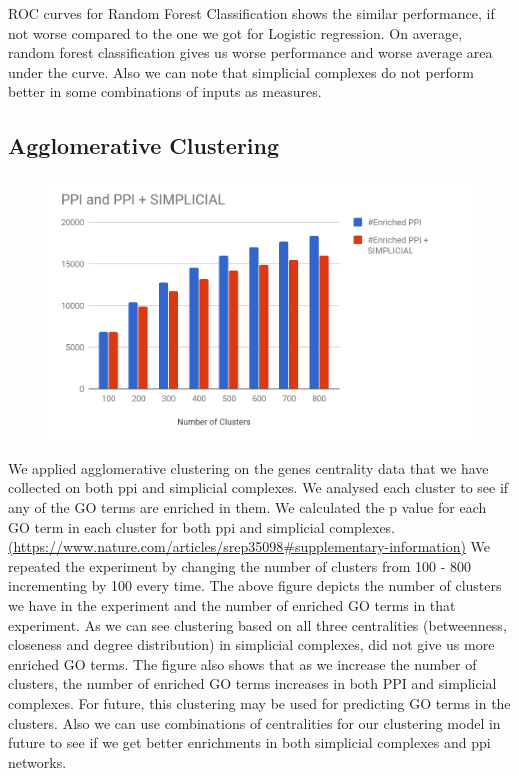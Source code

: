 \documentclass[9pt]{article}
\begin{document}
{\begin{figure}[!htb]
\endminipage
\end{figure}
ROC curves for Random Forest Classification shows the similar performance, if not worse compared to the one we got for Logistic regression. On average, random forest classification gives us worse performance and worse average area under the curve. Also we can note that simplicial complexes do not perform better in some combinations of inputs as measures.

\subsection{Agglomerative Clustering}
\begin{figure}[!htb]
  \centering
  \includegraphics[width=\linewidth]{logisticRegressionGraphs/cluster.png}
\endminipage
\end{figure}
We applied agglomerative clustering on the genes centrality data that we have collected on both ppi and simplicial complexes. We analysed each cluster to see if any of the GO terms are enriched in them. We calculated the p value for each GO term in each cluster for both ppi and simplicial complexes.\url{(https://www.nature.com/articles/srep35098\#supplementary-information)} We repeated the experiment by changing the number of clusters from 100 - 800 incrementing by 100 every time. The above figure depicts the number of clusters we have in the experiment and the number of enriched GO terms in that experiment. As we can see clustering based on all three centralities (betweenness, closeness and degree distribution) in simplicial complexes, did not give us more enriched GO terms. The figure also shows that as we increase the number of clusters, the number of enriched GO terms increases in both PPI and simplicial complexes. For future, this clustering may be used for predicting GO terms in the clusters. Also we can use combinations of centralities for our clustering model in future to see if we get better enrichments in both simplicial complexes and ppi networks. 

}
\end{document}
